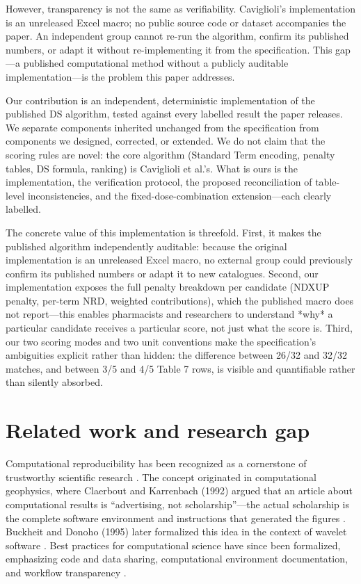 \documentclass[a4paper]{elsarticle}
\begin{document}
However, transparency is not the same as verifiability. Caviglioli's implementation is an unreleased Excel macro; no public source code or dataset accompanies the paper. An independent group cannot re-run the algorithm, confirm its published numbers, or adapt it without re-implementing it from the specification. This gap---a published computational method without a publicly auditable implementation---is the problem this paper addresses.

Our contribution is an independent, deterministic implementation of the published DS algorithm, tested against every labelled result the paper releases. We separate components inherited unchanged from the specification from components we designed, corrected, or extended. We do not claim that the scoring rules are novel: the core algorithm (Standard Term encoding, penalty tables, DS formula, ranking) is Caviglioli et al.'s. What is ours is the implementation, the verification protocol, the proposed reconciliation of table-level inconsistencies, and the fixed-dose-combination extension---each clearly labelled.

The concrete value of this implementation is threefold. First, it makes the published algorithm independently auditable: because the original implementation is an unreleased Excel macro, no external group could previously confirm its published numbers or adapt it to new catalogues. Second, our implementation exposes the full penalty breakdown per candidate (NDXUP penalty, per-term NRD, weighted contributions), which the published macro does not report---this enables pharmacists and researchers to understand *why* a particular candidate receives a particular score, not just what the score is. Third, our two scoring modes and two unit conventions make the specification's ambiguities explicit rather than hidden: the difference between 26/32 and 32/32 matches, and between 3/5 and 4/5 Table 7 rows, is visible and quantifiable rather than silently absorbed.

\section{Related work and research gap}
\label{sec:related}

Computational reproducibility has been recognized as a cornerstone of trustworthy scientific research \citep{nationalacademies2019reproducibility,peng2011reproducible,peng2006reproducible}. The concept originated in computational geophysics, where Claerbout and Karrenbach (1992) argued that an article about computational results is ``advertising, not scholarship''---the actual scholarship is the complete software environment and instructions that generated the figures \citep{claerbout1992electronic}. Buckheit and Donoho (1995) later formalized this idea in the context of wavelet software \citep{buckheit1995wavelab}. Best practices for computational science have since been formalized, emphasizing code and data sharing, computational environment documentation, and workflow transparency \citep{stodden2014reproducible,stodden2014best,wilson2014best,taschuk2017ten,wilson2017good}.
\end{document}
